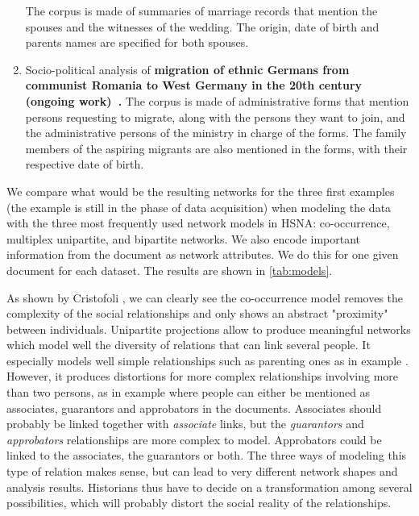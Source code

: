 \begin{enumerate}[nosep,leftmargin=*]
    The corpus is made of summaries of marriage records that mention the spouses and the witnesses of the wedding.
    The origin, date of birth and parents names are specified for both spouses.
     \item Socio-political analysis of \textbf{migration of ethnic Germans from communist Romania to West Germany in the 20th century (ongoing work)~\cite{diminescu:hal-02556007}.}
     The corpus is made of administrative forms that mention persons requesting to migrate, along with the persons they want to join, and the administrative persons of the ministry in charge of the forms.
     The family members of the aspiring migrants are also mentioned in the forms, with their respective date of birth.
\end{enumerate}

We compare what would be the resulting networks for the three first examples (the example \dana is still in the phase of data acquisition) when modeling the data with the three most frequently used network models in HSNA: co-occurrence, multiplex unipartite, and bipartite networks.
We also encode important information from the document as network attributes.
We do this for one given document for each dataset.
The results are shown in \autoref{tab:models}.

As shown by Cristofoli \cite{cristofoliAuxSourcesGrands2008}, we can clearly see the co-occurrence model removes the complexity of the social relationships and only shows an abstract "proximity" between individuals.
Unipartite projections allow to produce meaningful networks which model well the diversity of relations that can link several people.
It especially models well simple relationships such as parenting ones as in example \nicole.
However, it produces distortions for more complex relationships involving more than two persons, as in example \pascal where people can either be mentioned as associates, guarantors and approbators in the documents.
Associates should probably be linked together with \textit{associate} links, but the \textit{guarantors} and \textit{approbators} relationships are more complex to model.
Approbators could be linked to the associates, the guarantors or both.
The three ways of modeling this type of relation makes sense, but can lead to very different network shapes and analysis results.
Historians thus have to decide on a transformation among several possibilities, which will probably distort the social reality of the relationships.

